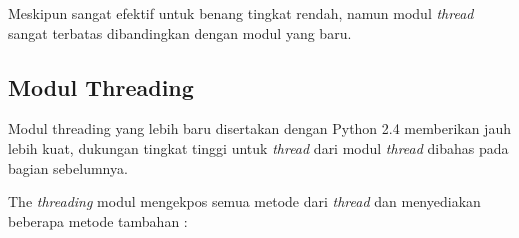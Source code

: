 \documentclass [12pt,a4paper,notitlepage,oneside,bahasa]{article}
\begin{document}
\vspace{12pt}
\hspace*{0.5in} Meskipun sangat efektif untuk benang tingkat rendah, namun modul \textit{thread} sangat terbatas dibandingkan dengan modul yang baru. \par

\vspace{12pt}


\subsection {Modul Threading} \par
\hspace*{0.5in} Modul threading yang lebih baru disertakan dengan Python 2.4 memberikan jauh lebih kuat, dukungan tingkat tinggi untuk \textit{thread}\textit{ }dari modul\textit{ }\textit{thread}\textit{ }dibahas pada bagian sebelumnya. \par
\hspace*{0.5in} The \textit{thread}\textit{ing }modul mengekpos semua metode dari \textit{thread}\textit{ }dan menyediakan beberapa metode tambahan : \par
\end{document}
